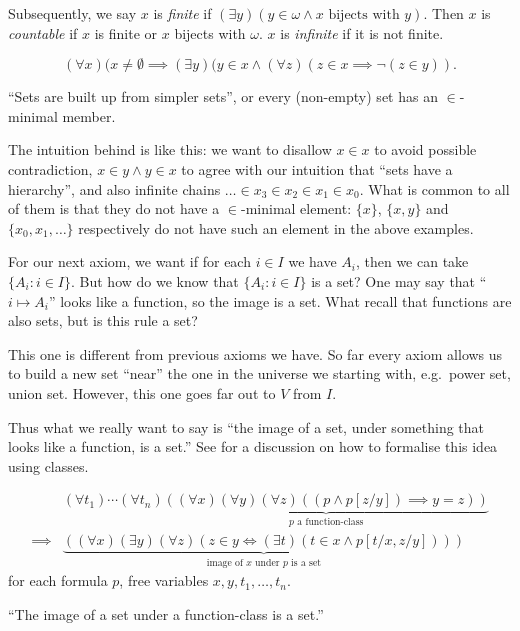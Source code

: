 \documentclass[a4paper]{article}
\begin{document}
Subsequently, we say \(x\) is \emph{finite} if \((\exists y) (y \in \omega \land x \text{ bijects with } y)\). Then \(x\) is \emph{countable} if \(x\) is finite or \(x\) bijects with \(\omega\). \(x\) is \emph{infinite} if it is not finite.

\begin{axiom*}
  \[
    (\forall x) (x \neq \emptyset \implies (\exists y) (y \in x \land (\forall z) (z \in x \implies \neg (z \in y)).
  \]
\end{axiom*}
``Sets are built up from simpler sets'', or every (non-empty) set has an \(\in\)-minimal member.

The intuition behind is like this: we want to disallow \(x \in x\) to avoid possible contradiction, \(x \in y \land y \in x\) to agree with our intuition that ``sets have a hierarchy'', and also infinite chains \(\dots \in x_3 \in x_2 \in x_1 \in x_0\). What is common to all of them is that they do not have a \(\in\)-minimal element: \(\{x\}\), \(\{x, y\}\) and \(\{x_0, x_1, \dots\}\) respectively do not have such an element in the above examples.

For our next axiom, we want if for each \(i \in I\) we have \(A_i\), then we can take \(\{A_i: i \in I\}\). But how do we know that \(\{A_i: i \in I\}\) is a set? One may say that ``\(i \mapsto A_i\)'' looks like a function, so the image is a set. What recall that functions are also sets, but is this rule a set?

This one is different from previous axioms we have. So far every axiom allows us to build a new set ``near'' the one in the universe we starting with, e.g.\ power set, union set. However, this one goes far out to \(V\) from \(I\).

Thus what we really want to say is ``the image of a set, under something that looks like a function, is a set.'' See  for a discussion on how to formalise this idea using classes.

\begin{axiom*}
  \begin{align*}
    & (\forall t_1) \cdots (\forall t_n) \underbrace{((\forall x) (\forall y) (\forall z) ((p \land p[z/y]) \implies y = z))}_{p \text{ a function-class}} \\
    \implies & \underbrace{((\forall x) (\exists y) (\forall z) (z \in y \iff (\exists t) (t \in x \land p[t/x, z/y])))}_{\text{image of \(x\) under \(p\) is a set}}
  \end{align*}
  for each formula \(p\), free variables \(x, y, t_1, \dots, t_n\).
\end{axiom*}
``The image of a set under a function-class is a set.''
\end{document}

